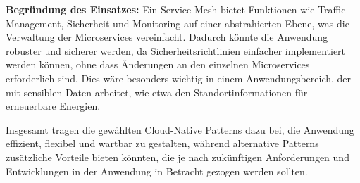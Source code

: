 \textbf{Begründung des Einsatzes:} 
Ein Service Mesh bietet Funktionen wie Traffic Management, Sicherheit und Monitoring auf einer abstrahierten Ebene, was die Verwaltung der Microservices vereinfacht. Dadurch könnte die Anwendung robuster und sicherer werden, da Sicherheitsrichtlinien einfacher implementiert werden können, ohne dass Änderungen an den einzelnen Microservices erforderlich sind. Dies wäre besonders wichtig in einem Anwendungsbereich, der mit sensiblen Daten arbeitet, wie etwa den Standortinformationen für erneuerbare Energien.

Insgesamt tragen die gewählten Cloud-Native Patterns dazu bei, die Anwendung effizient, flexibel und wartbar zu gestalten, während alternative Patterns zusätzliche Vorteile bieten könnten, die je nach zukünftigen Anforderungen und Entwicklungen in der Anwendung in Betracht gezogen werden sollten.
